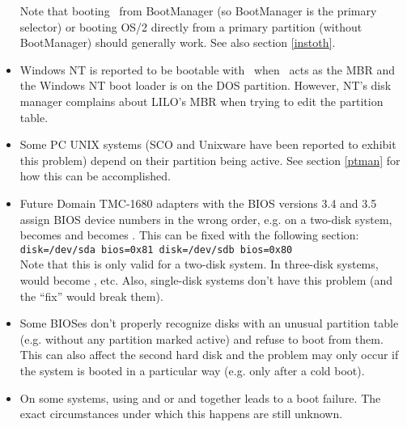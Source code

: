 \begin{itemize}
    Note that booting \LILO\ from BootManager (so BootManager is the
    primary selector) or booting OS/2 directly from a primary partition
    (without BootManager) should generally work. See also section
    \ref{instoth}.
  \item Windows NT is reported to be bootable with \LILO\ when \LILO\ acts as
    the MBR and the Windows NT boot loader is on the DOS partition. However,
    NT's disk manager complains about LILO's MBR when trying to edit the
    partition table.
  \item Some PC UNIX systems (SCO and Unixware have been reported to exhibit
    this problem) depend on their partition being active. See section
    \ref{ptman} for how this can be accomplished.
  \item Future Domain TMC-1680 adapters with the BIOS versions 3.4 and 3.5
    assign BIOS device numbers in the wrong order, e.g. on a two-disk system,
     becomes  and  becomes
    . This can be fixed with the following  section:\\
    \verb"disk=/dev/sda bios=0x81 disk=/dev/sdb bios=0x80"\\
    Note that this is only valid for a two-disk system. In three-disk
    systems,  would become , etc. Also, single-disk
    systems don't have this problem (and the ``fix'' would break them).
  \item Some BIOSes don't properly recognize disks with an unusual partition
    table (e.g. without any partition marked active) and refuse to boot from
    them. This can also affect the second hard disk and the problem may
    only occur if the system is booted in a particular way (e.g. only after a
    cold boot).
  \item On some systems, using  and  or 
     and  together
    leads to a boot failure. The exact circumstances under which this
    happens are still unknown.
\end{itemize}


